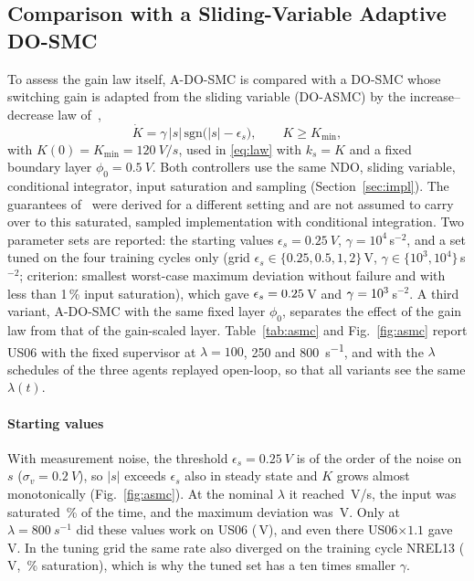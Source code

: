 \subsection{Comparison with a Sliding-Variable Adaptive DO-SMC}\label{sec:res_asmc}

To assess the gain law itself, A-DO-SMC is compared with a DO-SMC whose switching gain is adapted from the sliding variable (DO-ASMC) by the increase--decrease law of~\cite{plestan2010adaptive},
\begin{equation}
\dot K=\gamma\,|s|\,\mathrm{sgn}\big(|s|-\epsilon_s\big),\qquad K\ge K_{\min},\label{eq:asmc}
\end{equation}
with $K(0)=K_{\min}=\SI{120}{V/s}$, used in \eqref{eq:law} with $k_s=K$ and a fixed boundary layer $\phi_0=\SI{0.5}{V}$. Both controllers use the same NDO, sliding variable, conditional integrator, input saturation and sampling (Section~\ref{sec:impl}). The guarantees of~\cite{plestan2010adaptive} were derived for a different setting and are not assumed to carry over to this saturated, sampled implementation with conditional integration. Two parameter sets are reported: the starting values $\epsilon_s=\SI{0.25}{V}$, $\gamma=10^4$\,s$^{-2}$, and a set tuned on the four training cycles only (grid $\epsilon_s\in\{0.25,0.5,1,2\}$\,V, $\gamma\in\{10^3,10^4\}$\,s$^{-2}$; criterion: smallest worst-case maximum deviation without failure and with less than 1\,\% input saturation), which gave $\epsilon_s=0.25$\,V and $\gamma=10^{3}$\,s$^{-2}$. A third variant, A-DO-SMC with the same fixed layer $\phi_0$, separates the effect of the gain law from that of the gain-scaled layer. Table~\ref{tab:asmc} and Fig.~\ref{fig:asmc} report US06 with the fixed supervisor at $\lambda=100$, 250 and \SI{800}{s^{-1}}, and with the $\lambda$ schedules of the three agents replayed open-loop, so that all variants see the same $\lambda(t)$.

\paragraph{Starting values}
With measurement noise, the threshold $\epsilon_s=\SI{0.25}{V}$ is of the order of the noise on $s$ ($\sigma_v=\SI{0.2}{V}$), so $|s|$ exceeds $\epsilon_s$ also in steady state and $K$ grows almost monotonically (Fig.~\ref{fig:asmc}). At the nominal $\lambda$ it reached \CmpAzNKs\,V/s, the input was saturated \CmpAzNSat\,\% of the time, and the maximum deviation was \CmpAzNMax\,V. Only at $\lambda=\SI{800}{s^{-1}}$ did these values work on US06 (\CmpAzHMax\,V), and even there US06$\times1.1$ gave \CmpAzHMaxB\,V. In the tuning grid the same rate also diverged on the training cycle NREL13 (\TuneBadMax\,V, \TuneBadSat\,\% saturation), which is why the tuned set has a ten times smaller $\gamma$.

